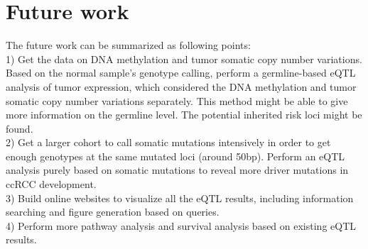 \chapter{Future work}

The future work can be summarized as following points:\\
1) Get the data on DNA methylation and tumor somatic copy number variations. Based on the normal sample's genotype calling, perform a germline-based eQTL analysis of tumor expression, which considered the DNA methylation and tumor somatic copy number variations separately. This method might be able to give more information on the germline level. The potential inherited risk loci might be found.\\
2) Get a larger cohort to call somatic mutations intensively in order to get enough genotypes at the same mutated loci (around 50bp). Perform an eQTL analysis purely based on somatic mutations to reveal more driver mutations in ccRCC development. \\
3) Build online websites to visualize all the eQTL results, including information searching and figure generation based on queries.\\
4) Perform more pathway analysis and survival analysis based on existing eQTL results.
